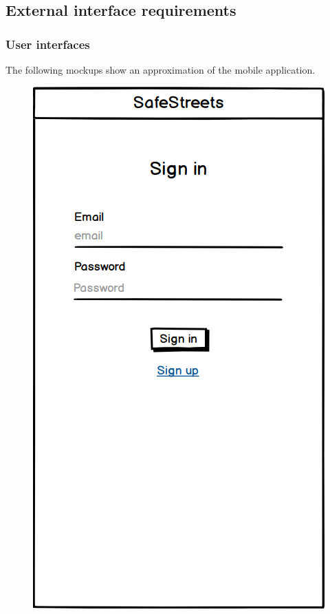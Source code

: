 \subsection{External interface requirements}
\subsubsection{User interfaces}
\begin{@empty}
The following mockups show an approximation of the mobile application.\\

\setlength{\intextsep}{0pt plus \textheight minus 10pt}

\begin{figure}[H]
\centering
\begin{minipage}{.4\textwidth}
    \centering
    \includegraphics[width=.8\textwidth]{Images/sign-in.png}

\end{minipage}
\end{figure}
\end{@empty}

